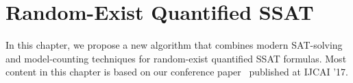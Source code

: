 \chapter{Random-Exist Quantified SSAT}
\label{chap:random-exist-ssat}

In this chapter, we propose a new algorithm that combines modern SAT-solving and model-counting techniques for random-exist quantified SSAT formulas.
Most content in this chapter is based on our conference paper~\cite{LeeIJCAI17RESSAT} published at IJCAI '17.



